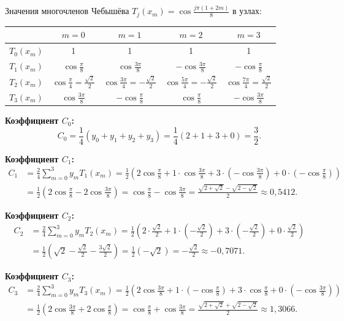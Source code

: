 \documentclass{article}
\begin{document}
Значения многочленов Чебышёва $T_j(x_m) = \cos\frac{j\pi(1+2m)}{8}$ в узлах:

\begin{center}
\begin{tabular}{|c|c|c|c|c|}
\hline
 & $m=0$ & $m=1$ & $m=2$ & $m=3$ \\
\hline
$T_0(x_m)$ & 1 & 1 & 1 & 1 \\
\hline
$T_1(x_m)$ & $\cos\frac{\pi}{8}$ & $\cos\frac{3\pi}{8}$ & $-\cos\frac{3\pi}{8}$ & $-\cos\frac{\pi}{8}$ \\
\hline
$T_2(x_m)$ & $\cos\frac{\pi}{4} = \frac{\sqrt{2}}{2}$ & $\cos\frac{3\pi}{4} = -\frac{\sqrt{2}}{2}$ & $\cos\frac{5\pi}{4} = -\frac{\sqrt{2}}{2}$ & $\cos\frac{7\pi}{4} = \frac{\sqrt{2}}{2}$ \\
\hline
$T_3(x_m)$ & $\cos\frac{3\pi}{8}$ & $-\cos\frac{\pi}{8}$ & $\cos\frac{\pi}{8}$ & $-\cos\frac{3\pi}{8}$ \\
\hline
\end{tabular}
\end{center}

\textbf{Коэффициент $C_0$:}
\begin{equation}
C_0 = \frac{1}{4}(y_0 + y_1 + y_2 + y_3) = \frac{1}{4}(2 + 1 + 3 + 0) = \frac{3}{2}.
\end{equation}

\textbf{Коэффициент $C_1$:}
\begin{align}
C_1 &= \frac{2}{4} \sum_{m=0}^{3} y_m T_1(x_m) = \frac{1}{2}\left(2\cos\frac{\pi}{8} + 1\cdot\cos\frac{3\pi}{8} + 3\cdot\left(-\cos\frac{3\pi}{8}\right) + 0\cdot\left(-\cos\frac{\pi}{8}\right)\right) \nonumber \\
&= \frac{1}{2}\left(2\cos\frac{\pi}{8} - 2\cos\frac{3\pi}{8}\right) = \cos\frac{\pi}{8} - \cos\frac{3\pi}{8} = \frac{\sqrt{2+\sqrt{2}} - \sqrt{2-\sqrt{2}}}{2} \approx 0{,}5412.
\end{align}

\textbf{Коэффициент $C_2$:}
\begin{align}
C_2 &= \frac{2}{4} \sum_{m=0}^{3} y_m T_2(x_m) = \frac{1}{2}\left(2\cdot\frac{\sqrt{2}}{2} + 1\cdot\left(-\frac{\sqrt{2}}{2}\right) + 3\cdot\left(-\frac{\sqrt{2}}{2}\right) + 0\cdot\frac{\sqrt{2}}{2}\right) \nonumber \\
&= \frac{1}{2}\left(\sqrt{2} - \frac{\sqrt{2}}{2} - \frac{3\sqrt{2}}{2}\right) = \frac{1}{2}\left(-\sqrt{2}\right) = -\frac{\sqrt{2}}{2} \approx -0{,}7071.
\end{align}

\textbf{Коэффициент $C_3$:}
\begin{align}
C_3 &= \frac{2}{4} \sum_{m=0}^{3} y_m T_3(x_m) = \frac{1}{2}\left(2\cos\frac{3\pi}{8} + 1\cdot\left(-\cos\frac{\pi}{8}\right) + 3\cdot\cos\frac{\pi}{8} + 0\cdot\left(-\cos\frac{3\pi}{8}\right)\right) \nonumber \\
&= \frac{1}{2}\left(2\cos\frac{3\pi}{8} + 2\cos\frac{\pi}{8}\right) = \cos\frac{\pi}{8} + \cos\frac{3\pi}{8} = \frac{\sqrt{2+\sqrt{2}} + \sqrt{2-\sqrt{2}}}{2} \approx 1{,}3066.
\end{align}
\end{document}

